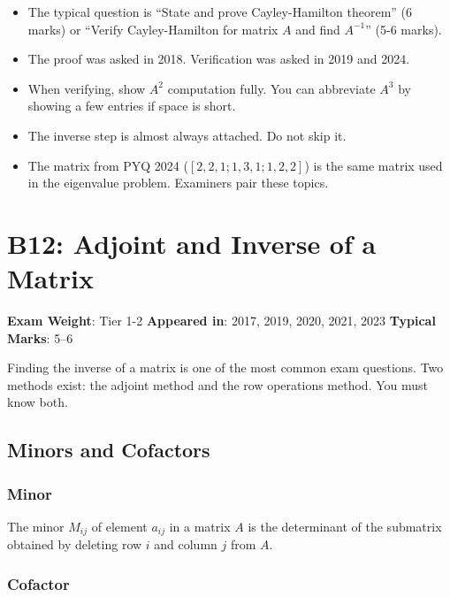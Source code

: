 \documentclass[
]{article}
\providecommand{\tightlist}{%
  \setlength{\itemsep}{0pt}\setlength{\parskip}{0pt}}
\renewenvironment{quote}
  {\begin{tcolorbox}[
     colback=calloutbg,
     colframe=calloutframe,
     colupper=callouttext,
     arc=3pt,
     boxrule=0.5pt,
     leftrule=0.5pt,
     borderline west={3pt}{0pt}{calloutaccent},
     left=8pt,
     right=8pt,
     top=6pt,
     bottom=6pt
   ]}
  {\end{tcolorbox}}
\begin{document}
\begin{itemize}
\tightlist
\item
  The typical question is ``State and prove Cayley-Hamilton theorem'' (6
  marks) or ``Verify Cayley-Hamilton for matrix \(A\) and find
  \(A^{-1}\)'' (5-6 marks).
\item
  The proof was asked in 2018. Verification was asked in 2019 and 2024.
\item
  When verifying, show \(A^2\) computation fully. You can abbreviate
  \(A^3\) by showing a few entries if space is short.
\item
  The inverse step is almost always attached. Do not skip it.
\item
  The matrix from PYQ 2024 (\([2,2,1; 1,3,1; 1,2,2]\)) is the same
  matrix used in the eigenvalue problem. Examiners pair these topics.
\end{itemize}

\section{B12: Adjoint and Inverse of a
Matrix}\label{b12-adjoint-and-inverse-of-a-matrix}

\begin{quote}
\textbf{Exam Weight}: Tier 1-2 \textbar{} \textbf{Appeared in}: 2017,
2019, 2020, 2021, 2023 \textbar{} \textbf{Typical Marks}: 5--6
\end{quote}

Finding the inverse of a matrix is one of the most common exam
questions. Two methods exist: the adjoint method and the row operations
method. You must know both.

\subsection{Minors and Cofactors}\label{minors-and-cofactors}

\subsubsection{Minor}\label{minor}

The minor \(M_{ij}\) of element \(a_{ij}\) in a matrix \(A\) is the
determinant of the submatrix obtained by deleting row \(i\) and column
\(j\) from \(A\).

\subsubsection{Cofactor}\label{cofactor}
\end{document}
